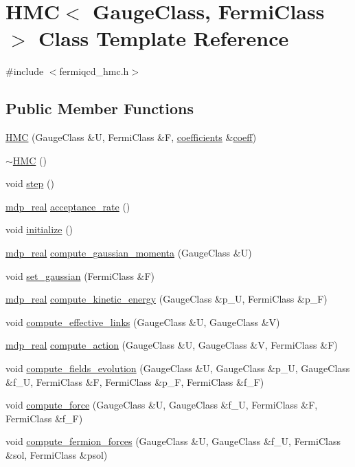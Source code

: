 \hypertarget{class_h_m_c}{
\section{HMC$<$ GaugeClass, FermiClass $>$ Class Template Reference}
\label{class_h_m_c}
}


{\ttfamily \#include $<$fermiqcd\_\-hmc.h$>$}\subsection*{Public Member Functions}
\begin{DoxyCompactItemize}
\item 
\hyperlink{class_h_m_c_aafdc157997f16364f023298ed1de48cb}{HMC} (GaugeClass \&U, FermiClass \&F, \hyperlink{classcoefficients}{coefficients} \&\hyperlink{class_h_m_c_aa7a373acc998a08fcdc2e86dc6084b7b}{coeff})
\item 
\hyperlink{class_h_m_c_add3a4a1409a737ccea8c7dae3760d0b3}{$\sim$HMC} ()
\item 
void \hyperlink{class_h_m_c_a97646bc15efc4db6c69e52f19f058ccd}{step} ()
\item 
\hyperlink{mdp__global__vars_8h_a049e4c1d4e74d644878a42f9909463e4}{mdp\_\-real} \hyperlink{class_h_m_c_a29d58281eca79c9fdc0f6160d4c61b53}{acceptance\_\-rate} ()
\item 
void \hyperlink{class_h_m_c_a796aa70365c8befa06b6e9a6064b332d}{initialize} ()
\item 
\hyperlink{mdp__global__vars_8h_a049e4c1d4e74d644878a42f9909463e4}{mdp\_\-real} \hyperlink{class_h_m_c_aaf6eb48e4a79b5c65b7fd80e9f34f072}{compute\_\-gaussian\_\-momenta} (GaugeClass \&U)
\item 
void \hyperlink{class_h_m_c_af2e951741710132d0bca8bc9d7fdd463}{set\_\-gaussian} (FermiClass \&F)
\item 
\hyperlink{mdp__global__vars_8h_a049e4c1d4e74d644878a42f9909463e4}{mdp\_\-real} \hyperlink{class_h_m_c_a278a4514882a4b585797364c6c7c1ba2}{compute\_\-kinetic\_\-energy} (GaugeClass \&p\_\-U, FermiClass \&p\_\-F)
\item 
void \hyperlink{class_h_m_c_a4d455373ccf133c6a7bb59c13bc6db32}{compute\_\-effective\_\-links} (GaugeClass \&U, GaugeClass \&V)
\item 
\hyperlink{mdp__global__vars_8h_a049e4c1d4e74d644878a42f9909463e4}{mdp\_\-real} \hyperlink{class_h_m_c_a28b4077c0a378abdbc3a75b27b6ec66c}{compute\_\-action} (GaugeClass \&U, GaugeClass \&V, FermiClass \&F)
\item 
void \hyperlink{class_h_m_c_aa91216c67c4304558aa47b9011abb9d2}{compute\_\-fields\_\-evolution} (GaugeClass \&U, GaugeClass \&p\_\-U, GaugeClass \&f\_\-U, FermiClass \&F, FermiClass \&p\_\-F, FermiClass \&f\_\-F)
\item 
void \hyperlink{class_h_m_c_a055e331f19f692a381f098e02f939e79}{compute\_\-force} (GaugeClass \&U, GaugeClass \&f\_\-U, FermiClass \&F, FermiClass \&f\_\-F)
\item 
void \hyperlink{class_h_m_c_a2e84b43878a9162a4370c6272f7db6ac}{compute\_\-fermion\_\-forces} (GaugeClass \&U, GaugeClass \&f\_\-U, FermiClass \&sol, FermiClass \&psol)
\end{DoxyCompactItemize}
